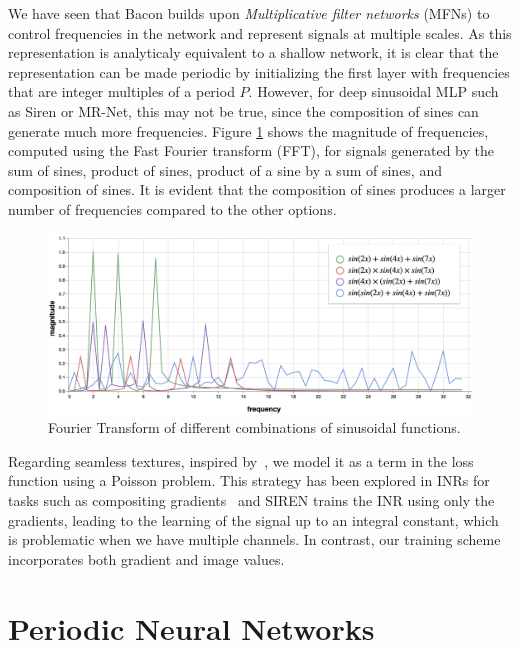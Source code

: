 We have seen that Bacon \cite{bacon2021} builds upon \textit{Multiplicative filter networks} (MFNs) \cite{fathony2020multiplicative} to control frequencies in the network and represent signals at multiple scales. As this representation is analyticaly equivalent to a shallow network, it is clear that the representation can be made periodic by initializing the first layer with frequencies that are integer multiples of a period $P$. However, for deep sinusoidal MLP such as Siren or MR-Net, this may not be true, since the composition of sines can generate much more frequencies. Figure \ref{f:generated-frequencies} shows the magnitude of frequencies, computed using the Fast Fourier transform (FFT), for signals generated by the sum of sines, product of sines, product of a sine by a sum of sines, and composition of sines. It is evident that the composition of sines produces a larger number of frequencies compared to the other options.

\begin{figure}[h]
\centering
\includegraphics[width=0.80\linewidth]{img/ch6/generated_frequencies.png}
\caption{Fourier Transform of different combinations of sinusoidal functions.}
\label{f:generated-frequencies}
\end{figure}
    

Regarding seamless textures, inspired by~\cite{perez2003}, we model it as a term in the loss  function using a Poisson problem. This strategy has been explored in INRs for tasks such as compositing gradients~\cite{sitzmann2019siren} and 
 SIREN trains the INR using only the gradients, leading to the learning of the signal up to an integral constant, which is problematic when we have multiple channels. In contrast, our training scheme incorporates both gradient and image values.


\section{Periodic Neural Networks}

